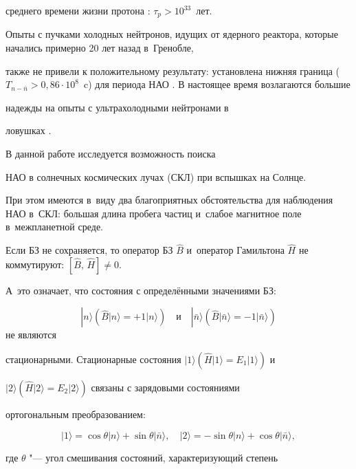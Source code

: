  среднего времени жизни протона \cite{mol3}: $\tau_p  >  10^{33}$~лет.

 Опыты с пучками холодных нейтронов, идущих от ядерного  реактора, которые начались примерно 20 лет назад  в~Гренобле,

 также не привели к положительному результату: установлена  нижняя граница \mbox{($T_{n-\bar  n}  >  0,86 \cdot 10^8$~c)} для периода НАО \cite{mol3}. В настоящее время возлагаются большие

 надежды на опыты с ультрахолодными нейтронами  в

 ловушках \cite{mol4, mol5}.



 В данной работе исследуется возможность  поиска

 НАО в солнечных космических лучах (СКЛ) при вспышках на  Солнце. 

 При этом имеются в~виду два благоприятных  обстоятельства для наблюдения НАО  в~СКЛ: большая длина  пробега частиц и~слабое магнитное поле в~межпланетной среде.

 

 \smallskip




Если БЗ не сохраняется, то оператор БЗ $\hat B$ и~оператор Гамильтона $\hat H$ не коммутируют: $[\hat B,\,\hat H]  \ne 0.$

 А~это означает, что состояния с определёнными значениями БЗ:

 $$|n \rangle  (\hat B|n \rangle {=} + 1 |n \rangle ) \quad  \text{и}\quad  |\bar  n \rangle  (\hat B  |\bar  n \rangle = - 1 |\bar   n \rangle)$$  не являются

стационарными. Стационарные состояния $|1 \rangle (\hat H |1 \rangle = E_1 |1 \rangle)$  и

$|2 \rangle  (\hat H  |2 \rangle = E_2  |2 \rangle)$  связаны с зарядовыми состояниями

ортогональным преобразованием:

   \begin{equation}\label{mol11:eq1}

 |1 \rangle   =  \cos \theta |n \rangle + \sin \theta  |\bar  n \rangle, \quad  |2 \rangle  =  -\sin \theta  |n \rangle + \cos \theta  |\bar  n \rangle,

 \end{equation}

 где $\theta$ "--- угол смешивания состояний, характеризующий степень

